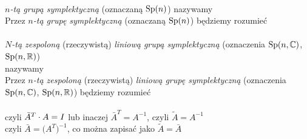 \documentclass[a4paper,11pt]{article}
\numberwithin{equation}{section}
\begin{document}
\noindent
{} \\
\Jest \textit{$n$-tą grupą symplektyczną} (oznaczaną $\mathrm{Sp}( n )$)
nazywamy \\
\PowinnoByc Przez \textit{$n$-tą grupę symplektyczną} (oznaczaną $\mathrm{Sp}( n )$)
będziemy rozumieć \\
 \\
\Jest \textit{$N$-tą zespoloną} (rzeczywistą) \textit{liniową grupą
  symplektyczną} (oznaczenia $\mathrm{Sp}( n, \mathbb{C} )$, $\mathrm{Sp}( n, \mathbb{R} )$) \\
nazywamy \\
\PowinnoByc Przez \textit{$n$-tą zespoloną} (rzeczywistą) \textit{liniową
  grupę symplektyczną} (oznaczenia $\mathrm{Sp}( n, \mathbb{C} )$, $\mathrm{Sp}( n, \mathbb{R} )$)
będziemy
rozumieć \\
 \\
\Jest czyli $\bar{A}^{ T } \cdot A = I$ lub inaczej
$\bar{A}^{ T } = A^{ -1 }$, czyli $\widetilde{A} = A^{ -1 }$ \\[0.5em]
\PowinnoByc czyli $\bar{A} = \Big( A^{ T } \Big)^{ -1 }$, co można zapisać
jako $\widetilde{A} = \bar{A}$ \\












\printbibliography





\end{document}
